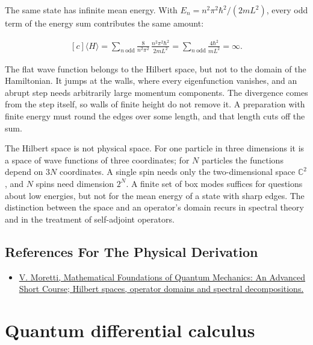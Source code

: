 \documentclass[11pt,oneside]{book}
\newenvironment{centeredalign}{\[\begin{gathered}[c]}{\end{gathered}\]}
\begin{document}
The same state has infinite mean energy. With \(E_n=n^2\pi^2\hbar^2/(2mL^2)\), every odd term of the energy sum contributes the same amount:

\begin{centeredalign}
\langle H\rangle=\sum_{n\ \text{odd}}\frac{8}{n^2\pi^2}\,
\frac{n^2\pi^2\hbar^2}{2mL^2}
=\sum_{n\ \text{odd}}\frac{4\hbar^2}{mL^2}=\infty.
\end{centeredalign}

The flat wave function belongs to the Hilbert space, but not to the domain of the Hamiltonian. It jumps at the walls, where every eigenfunction vanishes, and an abrupt step needs arbitrarily large momentum components. The divergence comes from the step itself, so walls of finite height do not remove it. A preparation with finite energy must round the edges over some length, and that length cuts off the sum.

The Hilbert space is not physical space. For one particle in three dimensions it is a space of wave functions of three coordinates; for \(N\) particles the functions depend on \(3N\) coordinates. A single spin needs only the two-dimensional space \(\mathbb C^2\), and \(N\) spins need dimension \(2^N\). A finite set of box modes suffices for questions about low energies, but not for the mean energy of a state with sharp edges. The distinction between the space and an operator's domain recurs in spectral theory and in the treatment of self-adjoint operators.

\subsection*{References For The Physical Derivation}
\begin{itemize}
\item \href{https://arxiv.org/abs/1508.06951}{V. Moretti, Mathematical Foundations of Quantum Mechanics: An Advanced Short Course; Hilbert spaces, operator domains and spectral decompositions.}
\end{itemize}





\clearpage

\section{Quantum differential calculus}

\label{topic:quantum-differential-calculus}
\end{document}
